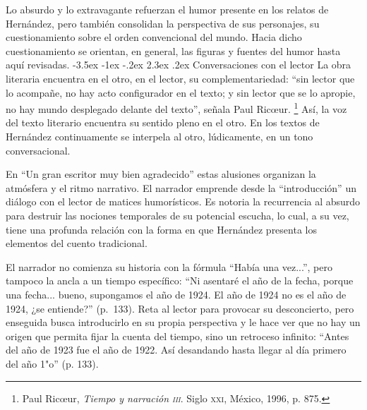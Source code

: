 \documentclass[14pt,twoside,final]{extbook} %
\makeatletter
\let\oldfootnote\footnote
\renewcommand\footnote[1]{%
\oldfootnote{\hspace{1mm}#1}}
\renewcommand\section{\@startsection {section}{1}{\z@}%
                                     {-3.5ex \@plus -1ex \@minus -.2ex}%
                                     {2.3ex \@plus .2ex}%
                                     {\normalfont\large\bfseries\sc}}
\makeatother
\begin{document}
Lo absurdo y lo extravagante refuerzan el humor presente en los relatos de Hernández, pero también consolidan la perspectiva de sus personajes, su cuestionamiento sobre el orden convencional del mundo. Hacia dicho cuestionamiento se orientan, en general, las figuras y fuentes del humor hasta aquí revisadas.
\section{Conversaciones con el lector}\label{sec:conversaciones-con-el-lector}
La obra literaria encuentra en el otro, en el lector, su complementariedad: ``sin lector que lo acompañe, no hay acto configurador en el texto; y sin lector que se lo apropie, no hay mundo desplegado delante del texto'', señala Paul Ric\oe ur.\footnote{Paul Ric\oe ur, \emph{Tiempo y narración \textsc{iii}}. Siglo \textsc{xxi}, México, 1996, p. 875.} Así, la voz del texto literario encuentra su sentido pleno en el otro. En los textos de Hernández continuamente se interpela al otro, lúdicamente, en un tono conversacional.

En ``Un gran escritor muy bien agradecido'' estas alusiones organizan la atmósfera y el ritmo narrativo. El narrador emprende desde la ``introducción'' un diálogo con el lector de matices humorísticos. Es notoria la recurrencia al absurdo para destruir las nociones temporales de su potencial escucha, lo cual, a su vez, tiene una profunda relación con la forma en que Hernández presenta los elementos del cuento tradicional.

El narrador no comienza su historia con la fórmula ``Había una vez...'', pero tampoco la ancla a un tiempo específico: ``Ni asentaré el año de la fecha, porque una fecha... bueno, supongamos el año de 1924. El año de 1924 no es el año de 1924, ¿se entiende?'' (p.~133). Reta al lector para provocar su
desconcierto, pero enseguida busca introducirlo en su propia perspectiva y le hace ver que no hay un origen que permita fijar la cuenta del tiempo, sino un retroceso infinito: ``Antes del año de 1923 fue el año de 1922. Así desandando hasta llegar al día primero del año 1"o'' (p. 133).
\end{document}
